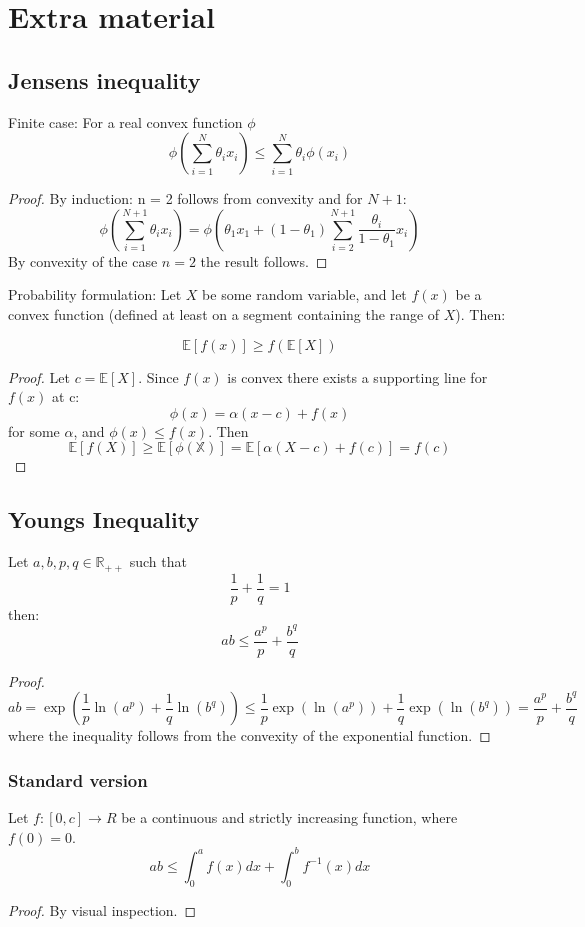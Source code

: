 \documentclass[titlepage]{article}
\begin{document}
\tableofcontents
\newpage
\section{Extra material}
\subsection{Jensens inequality}
Finite case: For a real convex function $\phi$
$$\phi\left(\sum_{i= 1}^N \theta_ix_i\right) \leq \sum_{i=1}^N\theta_i \phi(x_i)$$
\begin{proof}
By induction: n = 2 follows from convexity and for $N+1$:
$$\phi\left(\sum_{i= 1}^{N+1} \theta_ix_i\right) =  \phi\left(\theta_1x_1 + (1-\theta_1)\sum_{i= 2}^{N+1} \frac{\theta_i}{1-\theta_1}x_i\right) $$
By convexity of the case $n= 2$ the result follows.
\end{proof}
Probability formulation:
Let $X$ be some random variable, and let $f(x)$ be a convex function (defined at least on a segment containing the range of $X$). Then:

$$\mathbb{E}[f(x)] \geq f(\mathbb{E}[X])$$
\begin{proof}
Let $c = \mathbb{E}[X]$. Since $f(x)$ is convex there exists a supporting line for $f(x)$ at c:
$$\phi(x) = \alpha(x-c) + f(x)$$
for some $\alpha$, and $\phi(x) \leq f(x)$. Then
$$ \mathbb{E}[f(X)] \geq \mathbb{E[\phi(X)]} = \mathbb{E}[\alpha(X-c) + f(c)] = f(c)$$
\end{proof}
\subsection{Youngs Inequality}
Let $a,b ,p, q \in \mathbb{R}_{++}$ such that
$$\frac{1}{p} + \frac{1}{q} = 1$$
then:
$$ab\leq \frac{a^p}{p}+ \frac{b^q}{q} $$
\begin{proof}
$$ab = \exp\left(\frac{1}{p} \ln(a^p) + \frac{1}{q}\ln(b^q)\right) \leq 
\frac{1}{p}\exp(\ln(a^p)) + \frac{1}{q}\exp(\ln(b^q)) = \frac{a^p}{p} + \frac{b^q}{q} $$
where the inequality follows from the convexity of the exponential function.
\end{proof}

\subsubsection{Standard version}
Let $f:[0,c]\longrightarrow R$ be a continuous and strictly increasing function, where $f(0) = 0$.
$$ab\leq\int_0^a f(x)dx + \int_0^b f^{-1}(x)dx $$

\begin{proof}
By visual inspection.
\end{proof}
\end{document}
